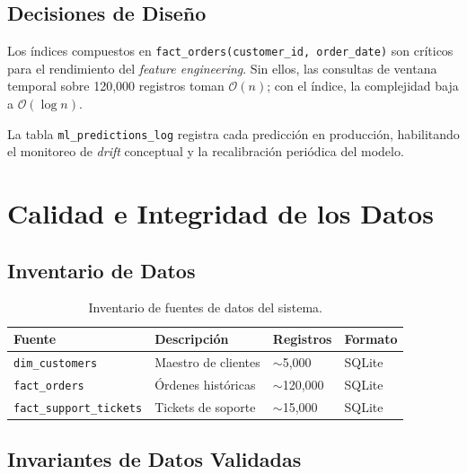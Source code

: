 \documentclass[12pt, letterpaper]{article}
\begin{document}
\subsection{Decisiones de Diseño}

Los índices compuestos en \texttt{fact\_orders(customer\_id, order\_date)}
son críticos para el rendimiento del \textit{feature engineering}. Sin ellos,
las consultas de ventana temporal sobre 120,000 registros toman $\mathcal{O}(n)$;
con el índice, la complejidad baja a $\mathcal{O}(\log n)$.

La tabla \texttt{ml\_predictions\_log} registra cada predicción en producción,
habilitando el monitoreo de \textit{drift} conceptual y la recalibración
periódica del modelo.

\section{Calidad e Integridad de los Datos}

\subsection{Inventario de Datos}

\begin{table}[H]
\centering
\caption{Inventario de fuentes de datos del sistema.}
\label{tab:inventory}
\begin{tabularx}{\textwidth}{lXll}
\toprule
\textbf{Fuente} & \textbf{Descripción} & \textbf{Registros} & \textbf{Formato} \\
\midrule
\texttt{dim\_customers} & Maestro de clientes & $\sim$5,000 & SQLite \\
\texttt{fact\_orders}   & Órdenes históricas  & $\sim$120,000 & SQLite \\
\texttt{fact\_support\_tickets} & Tickets de soporte & $\sim$15,000 & SQLite \\
\bottomrule
\end{tabularx}
\end{table}

\subsection{Invariantes de Datos Validadas}
\end{document}
